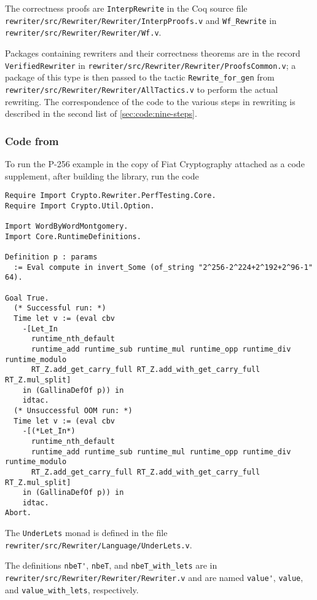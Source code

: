 \documentclass[a4paper,USenglish,cleveref,autoref,thm-restate]{lipics-v2021}
\begin{document}
\begin{minipage}[t][1cm]{\textwidth}
The correctness proofs are \verb|InterpRewrite| in the Coq source file \texttt{rewriter/src/Rewriter/Rewriter/InterpProofs.v} and \verb|Wf_Rewrite| in \texttt{rewriter/src/Rewriter/Rewriter/Wf.v}.

Packages containing rewriters and their correctness theorems are in the record \verb|VerifiedRewriter| in \texttt{rewriter/src/Rewriter/Rewriter/ProofsCommon.v};
a package of this type is then passed to the tactic \verb|Rewrite_for_gen| from \texttt{rewriter/src/Rewriter/Rewriter/AllTactics.v} to perform the actual rewriting.
The correspondence of the code to the various steps in rewriting is described in the second list of \autoref{sec:code:nine-steps}.

\subsubsection{Code from }

To run the P-256 example in the copy of Fiat Cryptography attached as a code supplement, after building the library, run the code
\begin{verbatim}
Require Import Crypto.Rewriter.PerfTesting.Core.
Require Import Crypto.Util.Option.

Import WordByWordMontgomery.
Import Core.RuntimeDefinitions.

Definition p : params
  := Eval compute in invert_Some (of_string "2^256-2^224+2^192+2^96-1" 64).

Goal True.
  (* Successful run: *)
  Time let v := (eval cbv
    -[Let_In
      runtime_nth_default
      runtime_add runtime_sub runtime_mul runtime_opp runtime_div runtime_modulo
      RT_Z.add_get_carry_full RT_Z.add_with_get_carry_full RT_Z.mul_split]
    in (GallinaDefOf p)) in
    idtac.
  (* Unsuccessful OOM run: *)
  Time let v := (eval cbv
    -[(*Let_In*)
      runtime_nth_default
      runtime_add runtime_sub runtime_mul runtime_opp runtime_div runtime_modulo
      RT_Z.add_get_carry_full RT_Z.add_with_get_carry_full RT_Z.mul_split]
    in (GallinaDefOf p)) in
    idtac.
Abort.
\end{verbatim}

The \verb|UnderLets| monad is defined in the file \texttt{rewriter/src/Rewriter/Language/UnderLets.v}.

The definitions \verb|nbeT'|, \verb|nbeT|, and \verb|nbeT_with_lets| are in \texttt{rewriter/src/Rewriter/Rewriter/Rewriter.v} and are named \verb|value'|, \verb|value|, and \verb|value_with_lets|, respectively.


\end{minipage}
\end{document}
